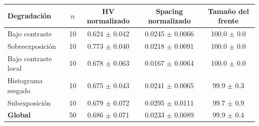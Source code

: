 \begin{tabular}{lcccc}
\hline
\textbf{Degradación} & \textbf{$n$} & \textbf{HV normalizado} & \textbf{Spacing normalizado} & \textbf{Tamaño del frente} \\
\hline
Bajo contraste & 10 & 0.624 $\pm$ 0.042 & 0.0245 $\pm$ 0.0066 & 100.0 $\pm$ 0.0 \\
Sobreexposición & 10 & 0.773 $\pm$ 0.040 & 0.0218 $\pm$ 0.0091 & 100.0 $\pm$ 0.0 \\
Bajo contraste local & 10 & 0.678 $\pm$ 0.063 & 0.0167 $\pm$ 0.0064 & 100.0 $\pm$ 0.0 \\
Histograma sesgado & 10 & 0.675 $\pm$ 0.043 & 0.0241 $\pm$ 0.0065 & 99.9 $\pm$ 0.3 \\
Subexposición & 10 & 0.679 $\pm$ 0.072 & 0.0295 $\pm$ 0.0111 & 99.7 $\pm$ 0.9 \\
\hline
\textbf{Global} & 50 & 0.686 $\pm$ 0.071 & 0.0233 $\pm$ 0.0089 & 99.9 $\pm$ 0.4 \\
\hline
\end{tabular}